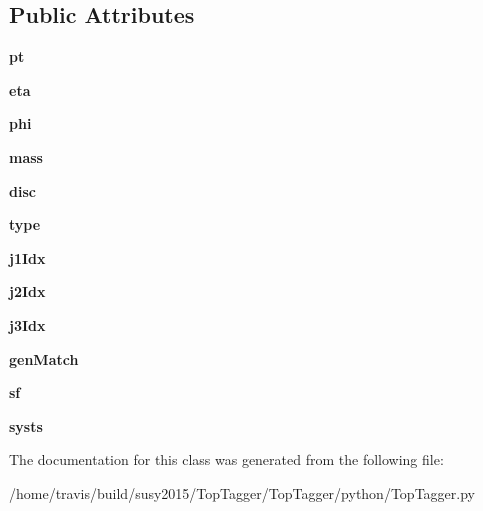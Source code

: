 \subsection*{Public Attributes}
\begin{DoxyCompactItemize}
\item 
\hypertarget{classTopTagger_1_1Top_a1eab0b54181fd0ea574e57b35ccc59e1}{{\bfseries pt}}\label{classTopTagger_1_1Top_a1eab0b54181fd0ea574e57b35ccc59e1}

\item 
\hypertarget{classTopTagger_1_1Top_a42895f21679a2a03ea4e320a9219b682}{{\bfseries eta}}\label{classTopTagger_1_1Top_a42895f21679a2a03ea4e320a9219b682}

\item 
\hypertarget{classTopTagger_1_1Top_af5ec16e9139fc919b6cca9f222915993}{{\bfseries phi}}\label{classTopTagger_1_1Top_af5ec16e9139fc919b6cca9f222915993}

\item 
\hypertarget{classTopTagger_1_1Top_a2a8d1553340a83f07989044d903813b2}{{\bfseries mass}}\label{classTopTagger_1_1Top_a2a8d1553340a83f07989044d903813b2}

\item 
\hypertarget{classTopTagger_1_1Top_a361f8b14fe698a10a815504bf554b5f9}{{\bfseries disc}}\label{classTopTagger_1_1Top_a361f8b14fe698a10a815504bf554b5f9}

\item 
\hypertarget{classTopTagger_1_1Top_a3da1fcb0f8ea21d672a105e30a03d496}{{\bfseries type}}\label{classTopTagger_1_1Top_a3da1fcb0f8ea21d672a105e30a03d496}

\item 
\hypertarget{classTopTagger_1_1Top_aebc3fb5ff67de0560cf769c4555de3b0}{{\bfseries j1\-Idx}}\label{classTopTagger_1_1Top_aebc3fb5ff67de0560cf769c4555de3b0}

\item 
\hypertarget{classTopTagger_1_1Top_a5543e5f414244684d33b9d0861013538}{{\bfseries j2\-Idx}}\label{classTopTagger_1_1Top_a5543e5f414244684d33b9d0861013538}

\item 
\hypertarget{classTopTagger_1_1Top_a71bca621aa593a25d15273386bda4cd0}{{\bfseries j3\-Idx}}\label{classTopTagger_1_1Top_a71bca621aa593a25d15273386bda4cd0}

\item 
\hypertarget{classTopTagger_1_1Top_ad0e512f41a8e47e2346b8c950162d1e9}{{\bfseries gen\-Match}}\label{classTopTagger_1_1Top_ad0e512f41a8e47e2346b8c950162d1e9}

\item 
\hypertarget{classTopTagger_1_1Top_a259645562ae12a67b9a3c5ea6a89264f}{{\bfseries sf}}\label{classTopTagger_1_1Top_a259645562ae12a67b9a3c5ea6a89264f}

\item 
\hypertarget{classTopTagger_1_1Top_a17325ceea5c3558fa47f96bd9a3eebb7}{{\bfseries systs}}\label{classTopTagger_1_1Top_a17325ceea5c3558fa47f96bd9a3eebb7}

\end{DoxyCompactItemize}


The documentation for this class was generated from the following file\-:\begin{DoxyCompactItemize}
\item 
/home/travis/build/susy2015/\-Top\-Tagger/\-Top\-Tagger/python/Top\-Tagger.\-py\end{DoxyCompactItemize}

